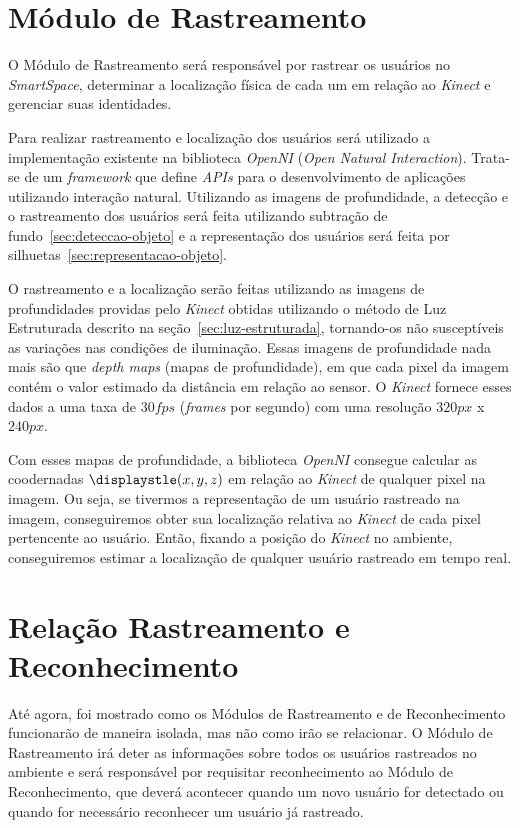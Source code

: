 \section{Módulo de Rastreamento}

	O Módulo de Rastreamento será responsável por rastrear os usuários no \textit{SmartSpace}, determinar a localização física de cada um em relação ao \textit{Kinect} e gerenciar suas identidades.

	Para realizar rastreamento e localização dos usuários será utilizado a implementação existente na biblioteca \textit{OpenNI} (\textit{Open Natural Interaction}). Trata-se de um \textit{framework} que define \textit{APIs} para o desenvolvimento de aplicações utilizando interação natural. Utilizando as imagens de profundidade, a detecção e o rastreamento dos usuários será feita utilizando subtração de fundo~\ref{sec:deteccao-objeto} e a representação dos usuários será feita por silhuetas~\ref{sec:representacao-objeto}. 

	O rastreamento e a localização serão feitas utilizando as imagens de profundidades providas pelo \textit{Kinect} obtidas utilizando o método de Luz Estruturada descrito na seção~\ref{sec:luz-estruturada}, tornando-os não susceptíveis as variações nas condições de iluminação. Essas imagens de profundidade nada mais são que \textit{depth maps} (mapas de profundidade), em que cada pixel da imagem contém o valor estimado da distância em relação ao sensor. O \textit{Kinect} fornece esses dados a uma taxa de $\displaystyle 30 fps$ (\textit{frames} por segundo) com uma resolução $\displaystyle 320px$ x $\displaystyle 240px$.
	
	Com esses mapas de profundidade, a biblioteca \textit{OpenNI} consegue calcular as coodernadas $\displaystle (x,y,z)$ em relação ao \textit{Kinect} de qualquer pixel na imagem. Ou seja, se tivermos a representação de um usuário rastreado na imagem, conseguiremos obter sua localização relativa ao \textit{Kinect} de cada pixel pertencente ao usuário. Então, fixando a posição do \textit{Kinect} no ambiente, conseguiremos estimar a localização de qualquer usuário rastreado em tempo real.

\section{Relação Rastreamento e Reconhecimento}
\label{sec:rastreamento-reconhecimento}

	Até agora, foi mostrado como os Módulos de Rastreamento e de Reconhecimento funcionarão de maneira isolada, mas não como irão se relacionar. O Módulo de Rastreamento irá deter as informações sobre todos os usuários rastreados no ambiente e será responsável por requisitar reconhecimento ao Módulo de Reconhecimento, que deverá acontecer quando um novo usuário for detectado ou quando for necessário reconhecer um usuário já rastreado.

